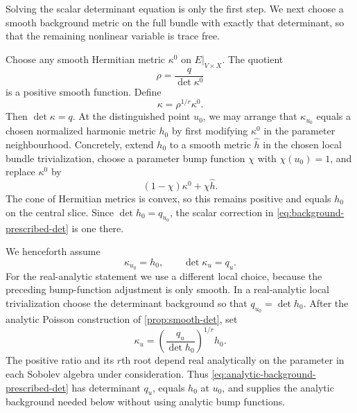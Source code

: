 \documentclass[11pt,reqno]{amsart}
\theoremstyle{definition}
\theoremstyle{remark}
\begin{document}
Solving the scalar determinant equation is only the first step.  We next choose a smooth background metric on the full bundle with exactly that determinant, so that the remaining nonlinear variable is trace free.


Choose any smooth Hermitian metric $\kappa^0$ on $E|_{V\times X}$.  The quotient
\[
  \rho=\frac{q}{\det \kappa^0}
\]
is a positive smooth function.  Define
\begin{equation}\label{eq:background-prescribed-det}
  \kappa=\rho^{1/r}\kappa^0.
\end{equation}
Then $\det \kappa=q$.  At the distinguished point $u_0$, we may
arrange that $\kappa_{u_0}$ equals a chosen normalized harmonic metric
$h_0$ by first modifying $\kappa^0$ in the parameter neighbourhood.
Concretely, extend $h_0$ to a smooth metric $\widehat h$ in the chosen
local bundle trivialization, choose a parameter bump function $\chi$
with $\chi(u_0)=1$, and replace $\kappa^0$ by
\[
 (1-\chi)\kappa^0+\chi\widehat h.
\]
The cone of Hermitian metrics is convex, so this remains positive and
equals $h_0$ on the central slice.  Since $\det h_0=q_{u_0}$, the scalar
correction in \eqref{eq:background-prescribed-det} is one there.

We henceforth assume
\begin{equation}\label{eq:kappa-central-harmonic}
  \kappa_{u_0}=h_0,
  \qquad
  \det \kappa_u=q_u.
\end{equation}
For the real-analytic statement we use a different local choice, because the preceding bump-function adjustment is only smooth.  In a real-analytic local trivialization choose the determinant background so that $q_{u_0}=\det h_0$.  After the analytic Poisson construction of \cref{prop:smooth-det}, set
\begin{equation}\label{eq:analytic-background-prescribed-det}
  \kappa_u=\left(\frac{q_u}{\det h_0}\right)^{1/r}h_0.
\end{equation}
The positive ratio and its $r$th root depend real analytically on the parameter in each Sobolev algebra under consideration.  Thus \eqref{eq:analytic-background-prescribed-det} has determinant $q_u$, equals $h_0$ at $u_0$, and supplies the analytic background needed below without using analytic bump functions.
\end{document}
